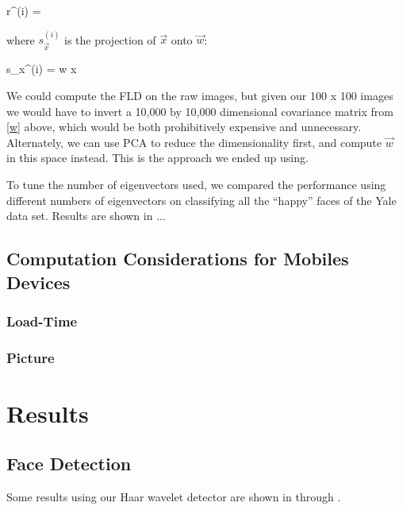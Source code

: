 \be
r^{(i)} = 
\ee


\noindent where $s_{\vec x}^{(i)}$ is the projection of $\vec x$ onto $\vec w$:

\be
s_{\vec x}^{(i)} = \vec w \cdot \vec x
\ee

We could compute the FLD on the raw images, but given our 100 x 100
images we would have to invert a 10,000 by 10,000 dimensional
covariance matrix from \eqref{w} above, which would be both
prohibitively expensive and unnecessary.  Alternately, we can use PCA
to reduce the dimensionality first, and compute $\vec w$ in this space
instead.  This is the approach we ended up using.

To tune the number of eigenvectors used, we compared the performance
using different numbers of eigenvectors on classifying all the
``happy'' faces of the Yale data set.  Results are shown in
...





\subsection{Computation Considerations for Mobiles Devices}


\subsubsection{Load-Time}
\subsubsection{Picture}



\section{Results} %

\subsection{Face Detection}


Some results using our Haar wavelet detector are shown in
 through .


